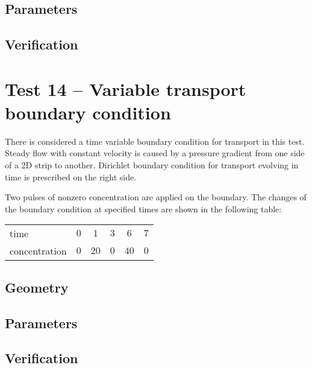 \subsection*{Parameters}

\subsection*{Verification}



\section{Test 14 -- Variable transport boundary condition}
There is considered a time variable boundary condition for transport in this test. Steady flow with constant velocity is caused by a pressure gradient from one side of a 2D strip to another. Dirichlet boundary condition for transport evolving in time is prescribed on the right side. 

Two pulses of nonzero concentration are applied on the boundary. The changes of the boundary condition at specified times are shown in the following table:

\begin{center}
  \begin{tabular}{|l|c|c|c|c|c|}
    \hline
    time & $0$ & $1$ & $3$ & $6$ & $7$\\
    concentration & $0$ & $20$ & $0$ & $40$ & $0$\\
    \hline
  \end{tabular}
\end{center}

\subsection*{Geometry}


\subsection*{Parameters}

\subsection*{Verification}




